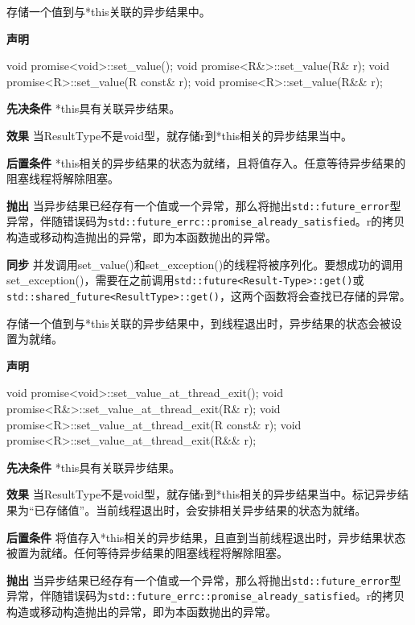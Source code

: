 存储一个值到与*this关联的异步结果中。

\textbf{声明}

\begin{cpp}
void promise<void>::set_value();
void promise<R&>::set_value(R& r);
void promise<R>::set_value(R const& r);
void promise<R>::set_value(R&& r);
\end{cpp}

\textbf{先决条件}
*this具有关联异步结果。

\textbf{效果}
当ResultType不是void型，就存储r到*this相关的异步结果当中。

\textbf{后置条件}
*this相关的异步结果的状态为就绪，且将值存入。任意等待异步结果的阻塞线程将解除阻塞。

\textbf{抛出}
当异步结果已经存有一个值或一个异常，那么将抛出\texttt{std::future\_error}型异常，伴随错误码为\texttt{std::future\_errc::promise\_already\_satisfied}。r的拷贝构造或移动构造抛出的异常，即为本函数抛出的异常。

\textbf{同步}
并发调用set\_value()和set\_exception()的线程将被序列化。要想成功的调用set\_exception()，需要在之前调用\texttt{std::future<Result-Type>::get()}或\texttt{std::shared\_future<ResultType>::get()}，这两个函数将会查找已存储的异常。


存储一个值到与*this关联的异步结果中，到线程退出时，异步结果的状态会被设置为就绪。

\textbf{声明}

\begin{cpp}
void promise<void>::set_value_at_thread_exit();
void promise<R&>::set_value_at_thread_exit(R& r);
void promise<R>::set_value_at_thread_exit(R const& r);
void promise<R>::set_value_at_thread_exit(R&& r);
\end{cpp}

\textbf{先决条件}
*this具有关联异步结果。

\textbf{效果}
当ResultType不是void型，就存储r到*this相关的异步结果当中。标记异步结果为“已存储值”。当前线程退出时，会安排相关异步结果的状态为就绪。

\textbf{后置条件}
将值存入*this相关的异步结果，且直到当前线程退出时，异步结果状态被置为就绪。任何等待异步结果的阻塞线程将解除阻塞。

\textbf{抛出}
当异步结果已经存有一个值或一个异常，那么将抛出\texttt{std::future\_error}型异常，伴随错误码为\texttt{std::future\_errc::promise\_already\_satisfied}。r的拷贝构造或移动构造抛出的异常，即为本函数抛出的异常。

